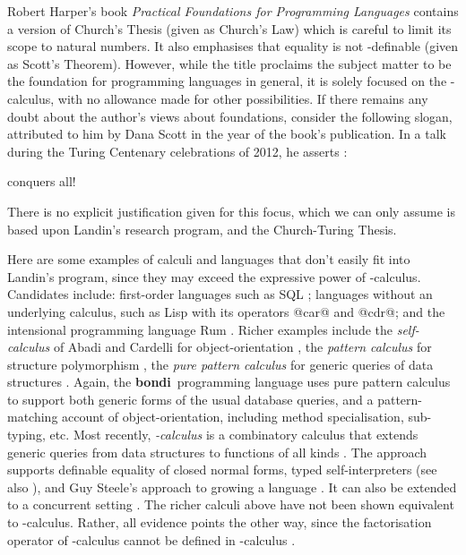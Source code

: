 \documentclass[a4paper]{article}
\begin{document}
Robert Harper's book {\em Practical Foundations for Programming
Languages} \cite{Harper12} contains a version of Church's Thesis
(given as Church's Law) which is careful to limit its scope to natural
numbers.  It also emphasises that equality is not -definable
(given as Scott's Theorem). However, while the title proclaims the
subject matter to be the foundation for programming languages in
general, it is solely focused on the -calculus, with no allowance
made for other possibilities.  If there
remains any doubt about the author's views about foundations, consider
the following slogan, attributed to him by Dana Scott in the year of
the book's publication.  In a talk during the Turing Centenary
celebrations of 2012, he asserts \cite{Scott12}:
\begin{center}
 conquers all!
\end{center}
There is no explicit justification given for this focus, which we can
only assume is based upon Landin's research program, and 
the Church-Turing Thesis.

Here are some examples of calculi and languages that don't easily fit
into Landin's program, since they may exceed the expressive power of
-calculus.  Candidates include: first-order languages such as SQL
\cite{sql}; languages without an underlying calculus, such as Lisp
\cite{McCarthy78a} with its operators @car@ and @cdr@; and the
intensional programming language Rum \cite{Talcott:phd85}.  Richer
examples include the {\em self-calculus} of Abadi and Cardelli for
object-orientation \cite{AC96}, the {\em pattern calculus} for
structure polymorphism \cite{Jay04b}, the {\em pure pattern calculus}
for generic queries of data structures \cite{JK09, pcb}. Again, the
{\bf bondi}\ programming language \cite{bondi}  uses pure pattern
calculus to support both generic forms of the usual database queries,
and a pattern-matching account of object-orientation, including method
specialisation, sub-typing, etc. Most recently, {\em -calculus} is
a combinatory calculus that extends generic queries from data
structures to functions of all kinds \cite{JGW11}. The approach
supports definable equality of closed normal forms, typed
self-interpreters \cite{JayPalsberg11} (see also
\cite{DBLP:conf/csl/Polonsky11}), and Guy Steele's approach
\cite{steele1999growing} to growing a language \cite{jay2013growing}.
It can also be extended to a concurrent setting
\cite{DBLP:journals/corr/Given-WilsonGJ14,GivenWilson14}.
The richer calculi above have not been shown equivalent to -calculus.
Rather, all evidence points the other way, since the factorisation
operator  of -calculus cannot be defined in -calculus
\cite{JGW11}.
\end{document}
